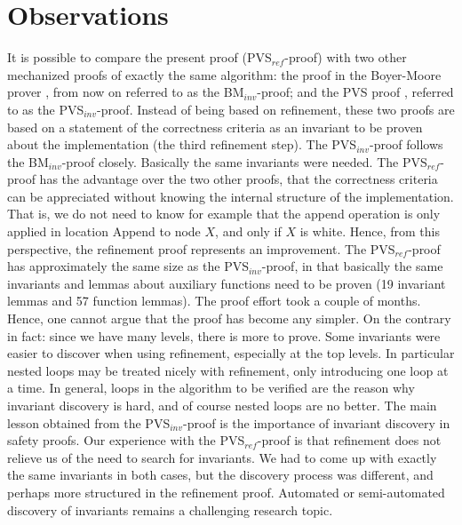 
\newcommand{\bm}{BM$_{inv}$}
\newcommand{\pvsinv}{PVS$_{inv}$}
\newcommand{\pvsref}{PVS$_{ref}$}
\newcommand{\unity}{UNITY$_{ref}$}


\section{Observations}
\label{observations}

It is possible  to compare the  present proof (\pvsref-proof) with two
other  mechanized proofs of exactly  the same algorithm:  the proof in
the Boyer-Moore prover \cite{Rus:GC},  from now on  referred to as the
\bm-proof; and   the  PVS proof   \cite{havelund-pvs-gc-99},  
referred  to as  the \pvsinv-proof.  Instead of being based on refinement, these two proofs
are  based on a statement of  the correctness criteria as an invariant
to be  proven about the  implementation (the third refinement step)\@. 
The \pvsinv-proof follows  the \bm-proof closely.  Basically  the same
invariants were needed. The \pvsref-proof has the advantage over the two
other proofs, that the correctness criteria can be appreciated without
knowing the internal structure of  the implementation.  That is, we do
not need to know for example that the append operation is only applied
in location  {\sc  Append} to node  $X$,  and only  if  $X$ is white.  
Hence, from  this  perspective,  the  refinement proof  represents  an
improvement.  The \pvsref-proof has approximately the same size as the
\pvsinv-proof, in that basically  the same invariants and lemmas about
auxiliary functions  need to  be proven (19   invariant lemmas and  57
function lemmas). The  proof effort took a couple   of months.  Hence,
one  cannot argue that  the proof   has  become any  simpler.   On the
contrary in fact: since  we have many levels, there  is more to prove. 
Some   invariants were easier   to   discover when using   refinement,
especially  at the  top  levels. In  particular  nested  loops may  be
treated  nicely with refinement, only introducing  one loop at a time. 
In general, loops in  the algorithm to be  verified are the reason why
invariant discovery is hard, and of course nested loops are no better.
The main lesson  obtained from the \pvsinv-proof  is the importance of
invariant discovery in   safety   proofs.  Our experience  with    the
\pvsref-proof is  that refinement does not  relieve us of  the need to
search for   invariants. We  had to  come   up with exactly   the same
invariants in both cases, but the discovery process was different, and
perhaps more structured in the refinement proof.
Automated or semi-automated discovery of invariants remains a challenging research topic.



